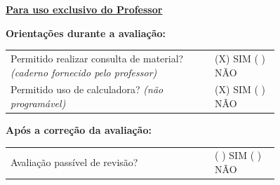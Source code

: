 \underline{\textbf{Para uso exclusivo do Professor}}

\begin{footnotesize}
\textbf{Orientações durante a avaliação:}

\renewcommand{\arraystretch}{1.1}
\begin{tabular}{@{}p{0.76\linewidth}@{}l@{}}
Permitido realizar consulta de material? \emph{(caderno fornecido pelo professor)} & (X) SIM \quad ( ) NÃO \\
Permitido uso de calculadora? \emph{(não programável)} & (X) SIM \quad ( ) NÃO \\
\end{tabular}

\textbf{Após a correção da avaliação:}

\begin{tabular}{@{}p{0.76\linewidth}@{}l@{}}
Avaliação passível de revisão? & ( ) SIM \quad ( ) NÃO \\
\end{tabular}
\end{footnotesize}
\endgroup

\fi
\clearpage
